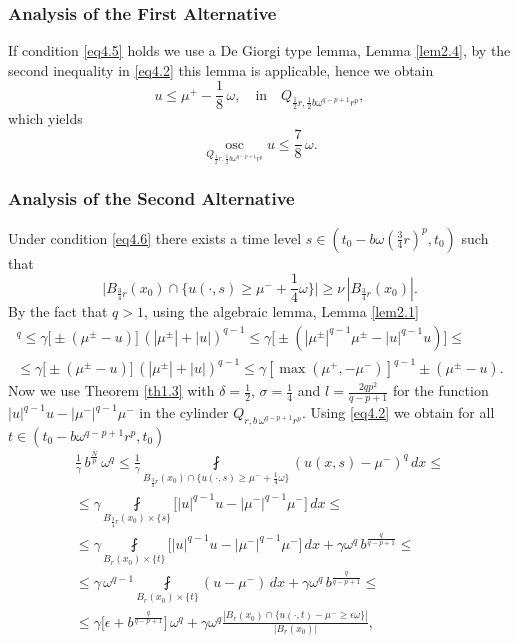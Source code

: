 \documentclass[a4paper,11pt,fullpage]{article}
\DeclareMathOperator*{\osc}{osc}
\numberwithin{equation}{section}
\begin{document}
\subsubsection{Analysis of the First Alternative}
If condition \eqref{eq4.5} holds we use a De Giorgi type lemma, Lemma \ref{lem2.4}, by the second inequality in \eqref{eq4.2} this lemma is applicable, hence we obtain
$$u\leqslant \mu^+-\frac{1}{8}\,\omega,\quad \text{in}\quad Q_{\frac{1}{2}r, \frac{1}{2} b\omega^{q-p+1} r^p},$$
which yields
\begin{equation}\label{eq4.7}
\osc\limits_{Q_{\frac{1}{2}r, \frac{1}{2} b\omega^{q-p+1} r^p}} u\leqslant \frac{7}{8}\,\omega.
\end{equation}

\subsubsection{Analysis of the Second Alternative}
Under condition \eqref{eq4.6} there exists a time level $s\in (t_0-b\omega(\frac{3}{4} r)^p, t_0)$ such that
\begin{equation*}
\big|B_{\frac{3}{4} r}(x_0)\cap\big\{u(\cdot, s)\geqslant \mu^-+\frac{1}{4}\omega\big\}\big|\geqslant \nu\,|B_{\frac{3}{4}r}(x_0)|.
\end{equation*}
By the fact that $q>1$, using the algebraic lemma, Lemma \ref{lem2.1}
\begin{multline*}
[\pm(\mu^{\pm}-u)]^q\leqslant \gamma \big[\pm(\mu^{\pm}-u)\big]\,(|\mu^{\pm}|+|u|)^{q-1}\leqslant \gamma \big[\pm(|\mu^{\pm}|^{q-1}\mu^{\pm}-|u|^{q-1}u)\big]\leqslant\\\leqslant \gamma \big[\pm(\mu^{\pm}-u)\big]\,(|\mu^{\pm}|+|u|)^{q-1}
\leqslant \gamma [\max(\mu^+, -\mu^-)]^{q-1} \pm(\mu^{\pm}-u).
\end{multline*}
Now we use Theorem \ref{th1.3} with $\delta=\frac{1}{2}$, $\sigma=\frac{1}{4}$ and $l=\frac{2 q p^2}{q-p+1}$ for the function $|u|^{q-1}u-|\mu^-|^{q-1}\mu^-$ in the cylinder $Q_{r, b\,\omega^{q-p+1} r^p}$. Using \eqref{eq4.2} we obtain for all $t\in (t_0-b \omega^{q-p+1} r^p, t_0)$
\begin{multline*}
\frac{1}{\gamma}\,b^{\frac{N}{p}}\,\omega^q\leqslant \frac{1}{\gamma}\fint\limits_{B_{\frac{3}{4} r}(x_0)\cap\{u(\cdot, s)\geqslant \mu^-+\frac{1}{4}\omega\}}(u(x, s)-\mu^-)^q\,dx\leqslant\\\leqslant 
\gamma \fint\limits_{B_{\frac{3}{4} r}(x_0)\times\{s\}}\Big[|u|^{q-1}u-|\mu^-|^{q-1}\mu^-\Big]\,dx\leqslant\\\leqslant
\gamma
\fint\limits_{B_r(x_0)\times\{t\}}\Big[|u|^{q-1}u-|\mu^-|^{q-1}\mu^-\Big]\,dx +\gamma \omega^q\,b^{\frac{q}{q-p+1}}\leqslant\\\leqslant
\gamma\,\omega^{q-1}\fint\limits_{B_r(x_0)\times\{t\}}(u-\mu^-)\,dx+\gamma \omega^q\,b^{\frac{q}{q-p+1}}\leqslant\\\leqslant
\gamma \Big[\epsilon+b^{\frac{q}{q-p+1}}\Big]\,\omega^q+\gamma \omega^q\frac{|B_r(x_0)\cap\{u(\cdot, t)-\mu^-\geqslant \epsilon \omega\}|}{|B_r(x_0)|},
\end{multline*}
\end{document}
